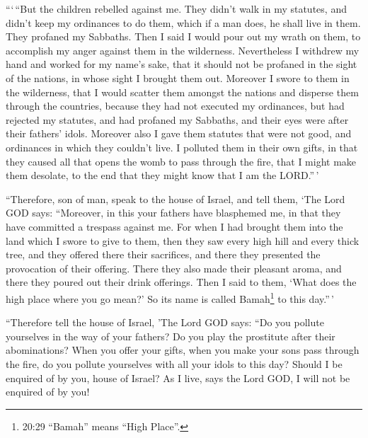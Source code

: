  ```\,``But the children rebelled against me. They didn't
walk in my statutes, and didn't keep my ordinances to do them, which if
a man does, he shall live in them. They profaned my Sabbaths. Then I
said I would pour out my wrath on them, to accomplish my anger against
them in the wilderness.  Nevertheless I withdrew my hand
and worked for my name's sake, that it should not be profaned in the
sight of the nations, in whose sight I brought them out. 
Moreover I swore to them in the wilderness, that I would scatter them
amongst the nations and disperse them through the countries,
 because they had not executed my ordinances, but had
rejected my statutes, and had profaned my Sabbaths, and their eyes were
after their fathers' idols.  Moreover also I gave them
statutes that were not good, and ordinances in which they couldn't live.
 I polluted them in their own gifts, in that they caused
all that opens the womb to pass through the fire, that I might make them
desolate, to the end that they might know that I am the LORD.''\,'

 ``Therefore, son of man, speak to the house of Israel, and
tell them, `The Lord GOD says: ``Moreover, in this your fathers have
blasphemed me, in that they have committed a trespass against me.
 For when I had brought them into the land which I swore to
give to them, then they saw every high hill and every thick tree, and
they offered there their sacrifices, and there they presented the
provocation of their offering. There they also made their pleasant
aroma, and there they poured out their drink offerings. 
Then I said to them, `What does the high place where you go mean?' So
its name is called Bamah\footnote{20:29 ``Bamah'' means ``High Place''.}
to this day.''\,'

 ``Therefore tell the house of Israel, 'The Lord GOD says:
``Do you pollute yourselves in the way of your fathers? Do you play the
prostitute after their abominations?  When you offer your
gifts, when you make your sons pass through the fire, do you pollute
yourselves with all your idols to this day? Should I be enquired of by
you, house of Israel? As I live, says the Lord GOD, I will not be
enquired of by you!

